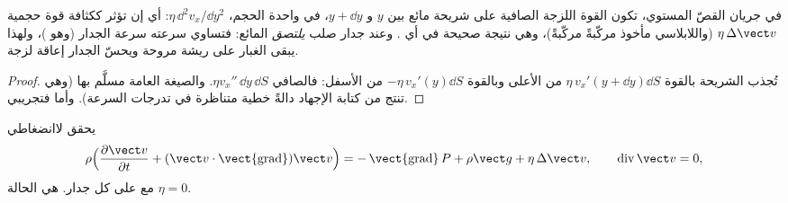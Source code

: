 \begin{proposition}\label{prop:b2:viscous-flows:density}
في جريان القصّ المستوي، تكون القوة اللزجة الصافية على شريحة
مائع بين $y$ و $y + \dd y$، في واحدة الحجم، $\eta\,\dd^2v_x/\dd y^2$:
أي إن  تؤثر ككثافة قوة حجمية $\eta\,\Delta\vect v$ (واللابلاسي
مأخوذ مركّبةً مركّبةً)، وهي نتيجة صحيحة في أي . وعند جدار صلب \emph{يلتصق} المائع: فتساوي سرعته سرعة
الجدار (وهو \emph{})، ولهذا يبقى الغبار على ريشة
مروحة ويحسّ الجدار إعاقة لزجة.
\end{proposition}

\begin{proof}
تُجذب الشريحة بالقوة $\eta\,v_x'(y + \dd y)\dd S$ من الأعلى وبالقوة
$-\eta\,v_x'(y)\dd S$ من الأسفل: فالصافي $\eta v_x''\,\dd y\,\dd S$. والصيغة
العامة مسلَّم بها (وهي تنتج من كتابة الإجهاد دالةً خطية
متناظرة في تدرجات السرعة). وأما  فتجريبي.
\end{proof}

\begin{theorem}\label{thm:b2:viscous-flows:ns}
يحقق  لاانضغاطي
\[
\rho\Bigl(\frac{\partial\vect v}{\partial t} + (\vect v\cdot\operatorname{\vect{grad}})
\vect v\Bigr) = -\operatorname{\vect{grad}}P + \rho\vect g + \eta\,\Delta\vect v ,
\qquad \operatorname{div}\vect v = 0 ,
\]
مع  على كل جدار.  هي الحالة
$\eta = 0$.
\end{theorem}
\admitted

